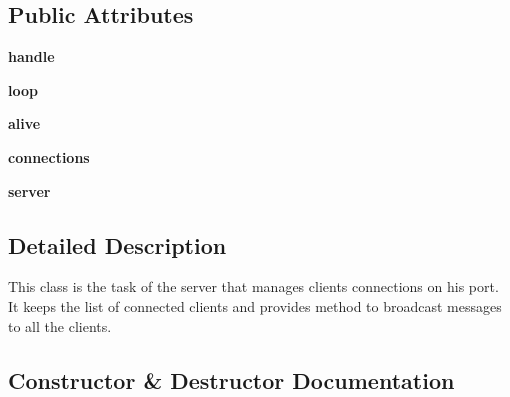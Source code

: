 \subsection*{Public Attributes}
\begin{DoxyCompactItemize}
\item 
\hypertarget{classsrc_1_1network_1_1_network_server_a96195545dea376f36baf32c07fa47c11}{}\label{classsrc_1_1network_1_1_network_server_a96195545dea376f36baf32c07fa47c11} 
{\bfseries handle}
\item 
\hypertarget{classsrc_1_1network_1_1_network_server_a85078be25c79326b1cda7f51fdcd970e}{}\label{classsrc_1_1network_1_1_network_server_a85078be25c79326b1cda7f51fdcd970e} 
{\bfseries loop}
\item 
\hypertarget{classsrc_1_1network_1_1_network_server_a8c8067aa50ec7554f5a7874755ed958c}{}\label{classsrc_1_1network_1_1_network_server_a8c8067aa50ec7554f5a7874755ed958c} 
{\bfseries alive}
\item 
\hypertarget{classsrc_1_1network_1_1_network_server_a08bf741ebed91f72c59f2cd7b51cd89d}{}\label{classsrc_1_1network_1_1_network_server_a08bf741ebed91f72c59f2cd7b51cd89d} 
{\bfseries connections}
\item 
\hypertarget{classsrc_1_1network_1_1_network_server_ae1c38c25e8eec1d2037b681ce6bb1cb5}{}\label{classsrc_1_1network_1_1_network_server_ae1c38c25e8eec1d2037b681ce6bb1cb5} 
{\bfseries server}
\end{DoxyCompactItemize}


\subsection{Detailed Description}
\begin{DoxyVerb}This class is the task of the server that manages clients connections on
his port.  It keeps the list of connected clients and provides method to
broadcast messages to all the clients.
\end{DoxyVerb}
 

\subsection{Constructor \& Destructor Documentation}
\hypertarget{classsrc_1_1network_1_1_network_server_a9448f34dc6fd380090e9ef394d79b548}{}\label{classsrc_1_1network_1_1_network_server_a9448f34dc6fd380090e9ef394d79b548} 
